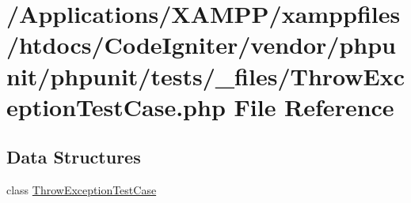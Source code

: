 \hypertarget{_throw_exception_test_case_8php}{}\section{/\+Applications/\+X\+A\+M\+P\+P/xamppfiles/htdocs/\+Code\+Igniter/vendor/phpunit/phpunit/tests/\+\_\+files/\+Throw\+Exception\+Test\+Case.php File Reference}
\label{_throw_exception_test_case_8php}
\subsection*{Data Structures}
\begin{DoxyCompactItemize}
\item 
class \mbox{\hyperlink{class_throw_exception_test_case}{Throw\+Exception\+Test\+Case}}
\end{DoxyCompactItemize}
